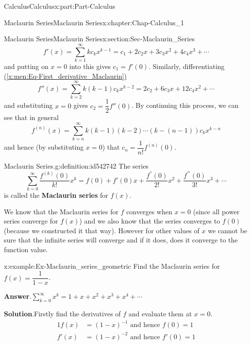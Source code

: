 \documentclass[oneside,10pt,]{book}
\newcommand{\blocktitlefont}{\relax}
\newcommand{\xreffont}{\relax}
\newcommand{\terminology}[1]{\textbf{#1}}
\numberwithin{equation}{section}
\newcommand{\amp}{&}
\begin{document}
\begin{partptx}{Calculus}{}{Calculus}{}{}{x:part:Part-Calculus}
\begin{chapterptx}{Maclaurin Series}{}{Maclaurin Series}{}{}{x:chapter:Chap-Calculus_1}
\begin{sectionptx}{Maclaurin Series}{}{Maclaurin Series}{}{}{x:section:Sec-Maclaurin_Series}
\begin{equation}
f'(x) = \sum_{k=1}^{\infty}kc_kx^{k-1} = c_1 +2c_2x +3c_3x^2 + 4c_4x^3 + \cdots\label{x:men:Eq-First_derivative_Maclaurin}
\end{equation}
and putting on \(x=0\) into this gives \(c_1=f'(0)\). Similarly, differentiating \hyperref[x:men:Eq-First_derivative_Maclaurin]{({\xreffont\ref{x:men:Eq-First_derivative_Maclaurin}})}%
\begin{equation}
f''(x) = \sum_{k=2}^{\infty}k(k-1)c_kx^{k-2} = 2c_2 +6c_3x + 12c_4x^2 + \cdots\label{g:men:id542751}
\end{equation}
and substituting \(x=0\) gives \(c_2=\dfrac{1}{2}f''(0)\). By continuing this process, we can see that in general%
\begin{equation}
f^{(n)}(x) = \sum_{k=n}^{\infty}k(k-1)(k-2)\cdots(k-(n-1))c_kx^{k-n}\label{g:men:id542750}
\end{equation}
and hence (by substituting \(x=0\)) that \(c_n = \dfrac{1}{n!}f^{(n)}(0)\).%
\begin{definition}{Maclaurin Series.}{g:definition:id542742}%
The series%
\begin{equation*}
\sum_{k=0}^{\infty}\dfrac{f^{(k)}(0)}{k!}x^k = f(0) + f'(0)x +\dfrac{f^{''}(0)}{2!}x^2 +\dfrac{f^{'''}(0)}{3!}x^3 + \cdots
\end{equation*}
is called the \terminology{Maclaurin series} for \(f(x)\).%
\end{definition}
We know that the Maclaurin series for \(f\) converges when \(x=0\) (since all power series converge for \(f(x)\)) and we also know that the series converges to \(f(0)\) (because we constructed it that way). However for other values of \(x\) we cannot be sure that the infinite series will converge and if it does, does it converge to the function value.%
\begin{example}{}{x:example:Ex-Maclaurin_series_geometric}%
Find the Maclaurin series for \(f(x)=\dfrac{1}{1-x}\).%
\par\smallskip%
\noindent\textbf{\blocktitlefont Answer}.\hypertarget{g:answer:id542812}{}\quad{}\(\displaystyle \sum_{k=0}^{\infty}x^k = 1+x+x^2+x^3+x^4+ \cdots\)%
\par\smallskip%
\noindent\textbf{\blocktitlefont Solution}.\hypertarget{g:solution:id542841}{}\quad{}Firstly find the derivatives of \(f\) and evaluate them at \(x=0\).%
\begin{alignat*}{1}
f(x) \amp = (1-x)^{-1} \text{ and hence } f(0)=1\\
f'(x) \amp = (1-x)^{-2} \text{ and hence } f'(0)=1\\

\end{alignat*}
\end{example}
\end{sectionptx}
\end{chapterptx}
\end{partptx}
\end{document}
